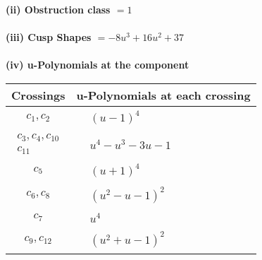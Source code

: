 \documentclass[1p]{elsarticle_modified}
\theoremstyle{definition}
\begin{document}
\flushleft \textbf{(ii) Obstruction class $= 1$}\\~\\
\flushleft \textbf{(iii) Cusp Shapes $= -8 u^3+16 u^2+37$}\\~\\
\newpage\renewcommand{\arraystretch}{1}
\flushleft \textbf{(iv) u-Polynomials at the component}\newline \\
\begin{tabular}{m{50pt}|m{274pt}}
Crossings & \hspace{64pt}u-Polynomials at each crossing \\
\hline $$\begin{aligned}c_{1},c_{2}\end{aligned}$$&$\begin{aligned}
&(u-1)^4
\end{aligned}$\\
\hline $$\begin{aligned}c_{3},c_{4},c_{10}\\c_{11}\end{aligned}$$&$\begin{aligned}
&u^4- u^3-3 u-1
\end{aligned}$\\
\hline $$\begin{aligned}c_{5}\end{aligned}$$&$\begin{aligned}
&(u+1)^4
\end{aligned}$\\
\hline $$\begin{aligned}c_{6},c_{8}\end{aligned}$$&$\begin{aligned}
&(u^2- u-1)^2
\end{aligned}$\\
\hline $$\begin{aligned}c_{7}\end{aligned}$$&$\begin{aligned}
&u^4
\end{aligned}$\\
\hline $$\begin{aligned}c_{9},c_{12}\end{aligned}$$&$\begin{aligned}
&(u^2+u-1)^2
\end{aligned}$\\
\hline
\end{tabular}\\~\\
\end{document}

